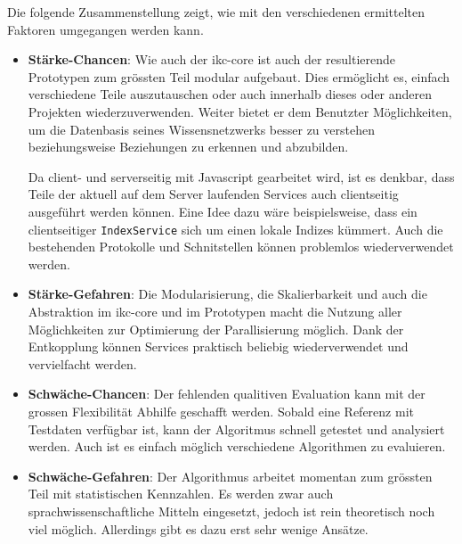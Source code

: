 
Die folgende Zusammenstellung zeigt, wie mit den verschiedenen ermittelten Faktoren umgegangen werden kann.


\begin{itemize}
    \item \textbf{Stärke-Chancen}: Wie auch der \gls{ikc-core} ist auch der resultierende Prototypen zum grössten Teil modular aufgebaut. Dies ermöglicht es, einfach verschiedene Teile auszutauschen oder auch innerhalb dieses oder anderen Projekten wiederzuverwenden. Weiter bietet er dem Benutzter Möglichkeiten, um die Datenbasis seines Wissensnetzwerks besser zu verstehen beziehungsweise Beziehungen zu erkennen und abzubilden.
    
    Da client- und serverseitig mit Javascript gearbeitet wird, ist es denkbar, dass Teile der aktuell auf dem Server laufenden Services auch clientseitig ausgeführt werden können. Eine Idee dazu wäre beispielsweise, dass ein clientseitiger \texttt{IndexService} sich um einen lokale Indizes kümmert. Auch die bestehenden Protokolle und Schnitstellen können problemlos wiederverwendet werden.
    \item \textbf{Stärke-Gefahren}: Die Modularisierung, die Skalierbarkeit und auch die Abstraktion im \gls{ikc-core} und im Prototypen macht die Nutzung aller Möglichkeiten zur Optimierung der Parallisierung möglich. Dank der Entkopplung können Services praktisch beliebig wiederverwendet und vervielfacht werden.
    \item \textbf{Schwäche-Chancen}: Der fehlenden qualitiven Evaluation kann mit der grossen Flexibilität Abhilfe geschafft werden. Sobald eine Referenz mit Testdaten verfügbar ist, kann der Algoritmus schnell getestet und analysiert werden. Auch ist es einfach möglich verschiedene Algorithmen zu evaluieren.
    \item \textbf{Schwäche-Gefahren}: Der Algorithmus arbeitet momentan zum grössten Teil mit statistischen Kennzahlen. Es werden zwar auch sprachwissenschaftliche Mitteln eingesetzt, jedoch ist rein theoretisch noch viel möglich. Allerdings gibt es dazu erst sehr wenige Ansätze.
\end{itemize}

